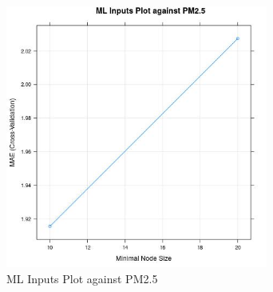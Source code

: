 \begin{figure} 
\centering  
\includegraphics[width=0.77\textwidth]{Code_Outputs/ML_report_task_1ranger_MAEvNVariables.jpg} 
\caption{\label{fig:ML_report_task_1rangerMAEvNVariables}ML Inputs Plot against PM2.5} 
\end{figure} 
 
